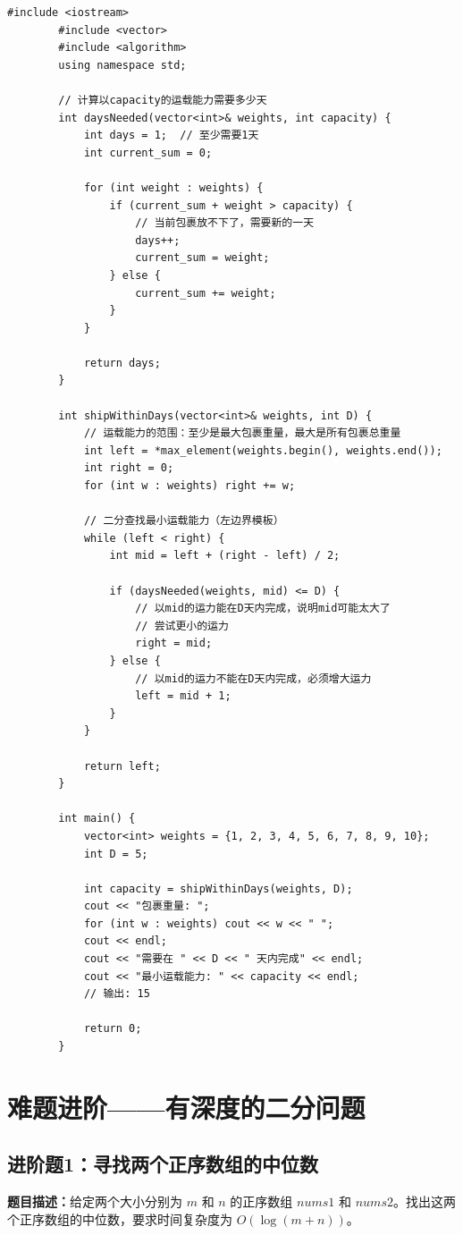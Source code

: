 \documentclass[12pt,a4paper]{article}
\begin{document}
	\begin{lstlisting}[caption={例题6：传送带运载能力}]
		#include <iostream>
		#include <vector>
		#include <algorithm>
		using namespace std;
		
		// 计算以capacity的运载能力需要多少天
		int daysNeeded(vector<int>& weights, int capacity) {
			int days = 1;  // 至少需要1天
			int current_sum = 0;
			
			for (int weight : weights) {
				if (current_sum + weight > capacity) {
					// 当前包裹放不下了，需要新的一天
					days++;
					current_sum = weight;
				} else {
					current_sum += weight;
				}
			}
			
			return days;
		}
		
		int shipWithinDays(vector<int>& weights, int D) {
			// 运载能力的范围：至少是最大包裹重量，最大是所有包裹总重量
			int left = *max_element(weights.begin(), weights.end());
			int right = 0;
			for (int w : weights) right += w;
			
			// 二分查找最小运载能力（左边界模板）
			while (left < right) {
				int mid = left + (right - left) / 2;
				
				if (daysNeeded(weights, mid) <= D) {
					// 以mid的运力能在D天内完成，说明mid可能太大了
					// 尝试更小的运力
					right = mid;
				} else {
					// 以mid的运力不能在D天内完成，必须增大运力
					left = mid + 1;
				}
			}
			
			return left;
		}
		
		int main() {
			vector<int> weights = {1, 2, 3, 4, 5, 6, 7, 8, 9, 10};
			int D = 5;
			
			int capacity = shipWithinDays(weights, D);
			cout << "包裹重量: ";
			for (int w : weights) cout << w << " ";
			cout << endl;
			cout << "需要在 " << D << " 天内完成" << endl;
			cout << "最小运载能力: " << capacity << endl;
			// 输出: 15
			
			return 0;
		}
	\end{lstlisting}
	
	\section{难题进阶——有深度的二分问题}
	
	\subsection{进阶题1：寻找两个正序数组的中位数}
	
	\textbf{题目描述：}给定两个大小分别为 $m$ 和 $n$ 的正序数组 $nums1$ 和 $nums2$。找出这两个正序数组的中位数，要求时间复杂度为 $O(\log(m+n))$。
	
\end{document}
